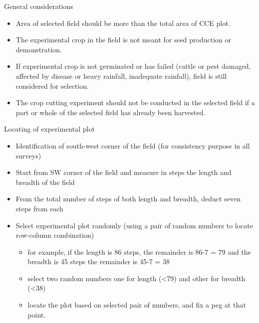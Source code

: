 \documentclass[11pt,dvipsnames,ignorenonframetext,aspectratio=169]{beamer}
\providecommand{\tightlist}{%
  \setlength{\itemsep}{0pt}\setlength{\parskip}{0pt}}
\begin{document}
\begin{frame}{General considerations}
\protect\hypertarget{general-considerations}{}
\begin{itemize}
\tightlist
\item
  Area of selected field should be more than the total area of CCE plot.
\item
  The experimental crop in the field is not meant for seed production or
  demonstration.
\item
  If experimental crop is not germinated or has failed (cattle or pest
  damaged, affected by disease or heavy rainfall, inadequate rainfall),
  field is still considered for selection.
\item
  The crop cutting experiment should not be conducted in the selected
  field if a part or whole of the selected field has already been
  harvested.
\end{itemize}
\end{frame}

\begin{frame}{Locating of experimental plot}
\protect\hypertarget{locating-of-experimental-plot}{}
\begin{itemize}
\tightlist
\item
  Identification of south-west corner of the field (for consistency
  purpose in all surveys)
\item
  Start from SW corner of the field and measure in steps the length and
  breadth of the field
\item
  From the total number of steps of both length and breadth, deduct
  seven steps from each
\item
  Select experimental plot randomly (using a pair of random numbers to
  locate row-column combination)

  \begin{itemize}
  \tightlist
  \item
    for example, if the length is 86 steps, the remainder is 86-7 = 79
    and the breadth is 45 steps the remainder is 45-7 = 38
  \item
    select two random numbers one for length (\textless79) and other for
    breadth (\textless38)
  \item
    locate the plot based on selected pair of numbers, and fix a peg at
    that point.
  \end{itemize}
\end{itemize}
\end{frame}
\end{document}
